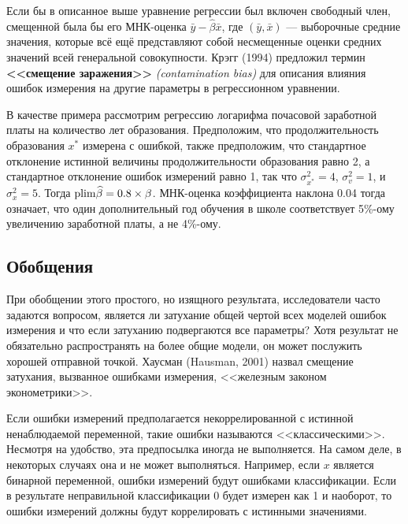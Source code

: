 Если бы в описанное выше уравнение регрессии был включен свободный член, смещенной была бы его МНК-оценка $\bar{y} - \widehat{\beta}\bar{x}$,  где $(\bar y, \bar x)$ --- выборочные средние значения, которые всё ещё представляют собой несмещенные оценки средних значений всей генеральной совокупности. Крэгг (1994) предложил термин {\bf <<смещение заражения>>} \emph{(contamination bias)} для описания влияния ошибок измерения на другие параметры в регрессионном уравнении.

В качестве примера рассмотрим регрессию логарифма почасовой заработной платы на количество лет образования. Предположим, что продолжительность образования $x^*$ измерена с ошибкой, также предположим, что стандартное отклонение истинной величины продолжительности образования равно 2, а стандартное отклонение ошибок измерений равно 1, так что $\sigma^2_{x^*}=4$, $\sigma^2_v=1$, и $\sigma^2_x=5$. Тогда $\mathrm{plim }\widehat{\beta}=0.8 \times \beta$. МНК-оценка коэффициента наклона 0.04 тогда означает, что один дополнительный год обучения в школе соответствует 5\%-ому увеличению заработной платы, а не 4\%-ому.

\subsection{Обобщения} 

При обобщении этого простого, но изящного результата, исследователи часто задаются вопросом, является ли затухание общей чертой всех моделей ошибок измерения и что если затуханию подвергаются все параметры? Хотя результат не обязательно распространять на более общие модели, он может послужить хорошей отправной точкой. Хаусман (Hausman, 2001) назвал смещение затухания, вызванное ошибками измерения, <<железным законом эконометрики>>. 

Если ошибки измерений предполагается некоррелированной с истинной ненаблюдаемой переменной, такие ошибки называются <<классическими>>. Несмотря на удобство, эта предпосылка иногда не выполняется. На самом деле, в некоторых случаях она и не может выполняться. Например, если $x$ является бинарной переменной, ошибки измерений будут ошибками классификации. Если в результате неправильной классификации 0 будет измерен как 1 и наоборот, то ошибки измерений должны будут коррелировать с истинными значениями.


